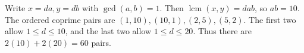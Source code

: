 Write $x=da,y=db$ with $\gcd(a,b)=1$. Then $\operatorname{lcm}(x,y)=dab$, so $ab=10$. The ordered coprime pairs are $(1,10),(10,1),(2,5),(5,2)$. The first two allow $1\le d\le10$, and the last two allow $1\le d\le20$. Thus there are $2(10)+2(20)=\boxed{60}$ pairs.
